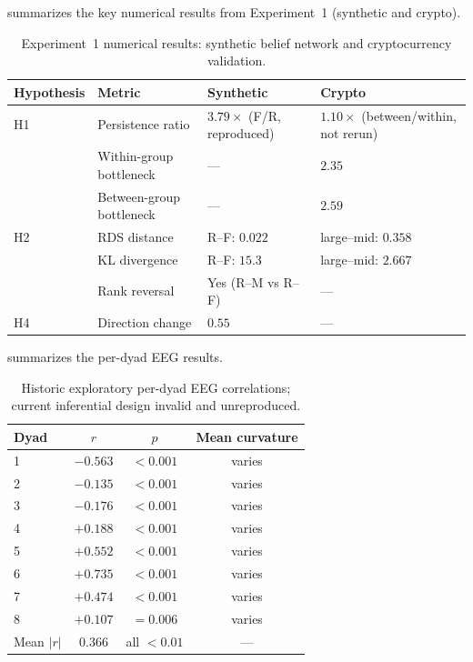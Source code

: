 \documentclass[11pt,a4paper]{article}
\theoremstyle{definition}
\begin{document}
 summarizes the key numerical results from Experiment~1 (synthetic and crypto).

\begin{table}[h]
\centering
\caption{Experiment~1 numerical results: synthetic belief network and cryptocurrency validation.}
\label{tab:exp1_results}
\begin{tabular}{@{}llll@{}}
\toprule
Hypothesis & Metric & Synthetic & Crypto \\
\midrule
H1 & Persistence ratio & $3.79\times$ (F/R, reproduced) & $1.10\times$ (between/within, not rerun) \\
    & Within-group bottleneck & --- & $2.35$ \\
    & Between-group bottleneck & --- & $2.59$ \\
\midrule
H2 & RDS distance & R--F: $0.022$ & large--mid: $0.358$ \\
    & KL divergence & R--F: $15.3$ & large--mid: $2.667$ \\
    & Rank reversal & Yes (R--M vs R--F) & --- \\
\midrule
H4 & Direction change & $0.55$ & --- \\
\bottomrule
\end{tabular}
\end{table}

 summarizes the per-dyad EEG results.

\begin{table}[h]
\centering
\caption{Historic exploratory per-dyad EEG correlations; current inferential design invalid and unreproduced.}
\label{tab:exp2_results}
\begin{tabular}{@{}lccc@{}}
\toprule
Dyad & $r$ & $p$ & Mean curvature \\
\midrule
1 & $-0.563$ & $< 0.001$ & varies \\
2 & $-0.135$ & $< 0.001$ & varies \\
3 & $-0.176$ & $< 0.001$ & varies \\
4 & $+0.188$ & $< 0.001$ & varies \\
5 & $+0.552$ & $< 0.001$ & varies \\
6 & $+0.735$ & $< 0.001$ & varies \\
7 & $+0.474$ & $< 0.001$ & varies \\
8 & $+0.107$ & $= 0.006$ & varies \\
\midrule
Mean $|r|$ & $0.366$ & all $< 0.01$ & --- \\
\bottomrule
\end{tabular}
\end{table}
\end{document}
